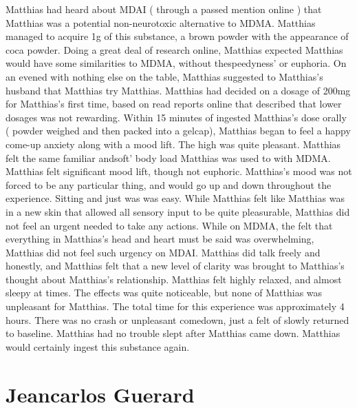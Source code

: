 \documentclass[12pt]{book}
\begin{document}
Matthias had heard about MDAI ( through a passed mention online ) that Matthias was a potential non-neurotoxic alternative to MDMA. Matthias managed to acquire 1g of this substance, a brown powder with the appearance of coca powder. Doing a great deal of research online, Matthias expected Matthias would have some similarities to MDMA, without thespeedyness' or euphoria. On an evened with nothing else on the table, Matthias suggested to Matthias's husband that Matthias try Matthias. Matthias had decided on a dosage of 200mg for Matthias's first time, based on read reports online that described that lower dosages was not rewarding. Within 15 minutes of ingested Matthias's dose orally ( powder weighed and then packed into a gelcap), Matthias began to feel a happy come-up anxiety along with a mood lift. The high was quite pleasant. Matthias felt the same familiar andsoft' body load Matthias was used to with MDMA. Matthias felt significant mood lift, though not euphoric. Matthias's mood was not forced to be any particular thing, and would go up and down throughout the experience. Sitting and just was was easy. While Matthias felt like Matthias was in a new skin that allowed all sensory input to be quite pleasurable, Matthias did not feel an urgent needed to take any actions. While on MDMA, the felt that everything in Matthias's head and heart must be said was overwhelming, Matthias did not feel such urgency on MDAI. Matthias did talk freely and honestly, and Matthias felt that a new level of clarity was brought to Matthias's thought about Matthias's relationship. Matthias felt highly relaxed, and almost sleepy at times. The effects was quite noticeable, but none of Matthias was unpleasant for Matthias. The total time for this experience was approximately 4 hours. There was no crash or unpleasant comedown, just a felt of slowly returned to baseline. Matthias had no trouble slept after Matthias came down. Matthias would certainly ingest this substance again.



\chapter{Jeancarlos Guerard}
\end{document}
